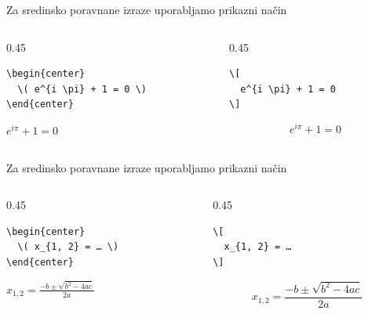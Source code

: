 \documentclass[aspectratio=169]{beamer}
\begin{document}
\begin{frame}[fragile]{Za sredinsko poravnane izraze uporabljamo prikazni način}
  \begin{columns}[t]
    \begin{column}{0.45\textwidth}
      \begin{slaboenv}
        \begin{verbatim}
\begin{center}
  \( e^{i \pi} + 1 = 0 \)
\end{center}
        \end{verbatim}
        \begin{center}
          \( e^{i \pi} + 1 = 0 \)
        \end{center}
      \end{slaboenv}
    \end{column}
    \begin{column}{0.45\textwidth}
      \begin{dobroenv}
        \begin{verbatim}
\[
  e^{i \pi} + 1 = 0
\]
        \end{verbatim}
        \[ e^{i \pi} + 1 = 0 \]
      \end{dobroenv}
    \end{column}
  \end{columns}
\end{frame}

\begin{frame}[fragile]{Za sredinsko poravnane izraze uporabljamo prikazni način}
  \begin{columns}[t]
    \begin{column}{0.45\textwidth}
      \begin{slaboenv}
        \begin{verbatim}
\begin{center}
  \( x_{1, 2} = … \)
\end{center}
        \end{verbatim}
        \begin{center}
          \( x_{1, 2} = \frac{-b \pm \sqrt{b^2 - 4ac}}{2a} \)
        \end{center}
      \end{slaboenv}
    \end{column}
    \begin{column}{0.45\textwidth}
      \begin{dobroenv}
        \begin{verbatim}
\[
  x_{1, 2} = …
\]
        \end{verbatim}
        \[ x_{1, 2} = \frac{-b \pm \sqrt{b^2 - 4ac}}{2a} \]
      \end{dobroenv}
    \end{column}
  \end{columns}
\end{frame}
\end{document}
